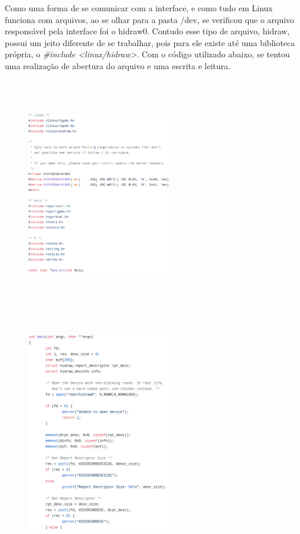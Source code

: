 \documentclass[conference]{IEEEtran}
\begin{document}
Como uma forma de se comunicar com a interface, e como tudo em Linux funciona com arquivos, ao se olhar para a pasta /dev, se verificou que o arquivo responsável pela interface foi o hidraw0. Contudo esse tipo de arquivo, hidraw, possui um jeito diferente de se trabalhar, pois para ele existe até uma biblioteca própria, o \textit{\#include <linux/hidraw>}. Com o código utilizado abaixo, se tentou uma realização de abertura do arquivo e uma escrita e leitura.

\begin{figure}[!htb]
\centering
\includegraphics[width=2.5in, height=4in]{Imagens/hid1}
\end{figure}
\begin{figure}[!htb]
\centering
\includegraphics[width=2.5in, height=4in]{Imagens/hid2}
\end{figure}
\end{document}
